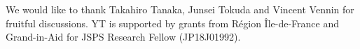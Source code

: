 \documentclass[a4paper,11pt]{article}
\begin{document}
\begin{comment}
Inspired by recent progress in the framework of curved-field-space inflation like 
\emph{geometrical destabilization}~\cite{Renaux-Petel:2015mga,Renaux-Petel:2017dia}, \emph{hyperinflation}~\cite{Brown:2017osf,Mizuno:2017idt},
and so on, we formulate the stochastic inflation in the curved field space case in this paper.
The fully covariant Langevin equations~(\ref{eq: covariant Langevin}) are derived in the effective Hamiltonian action approach, 
including metric perturbations.
While the metric perturbations only affect the equation of motion of the subhorizon mode functions,
the explicit appearance of the lapse function reveals that the Friedmann equation~(\ref{eq: Friedmann eq}) still holds in each Hubble patch 
without any noise.

As recently pointed out by Tokuda and Tanaka~\cite{Tokuda:2017fdh}, there is a fundamental problem in the time-depending decomposition
of the path integral measure and it is not completely understood but left as an important subject of future works.
Also we will study the behavior around or after the critical point in the geometrical destabilization framework with use of the obtained Langevin equations.
\end{comment}





\acknowledgments

We would like to thank Takahiro Tanaka, Junsei Tokuda and Vincent Vennin for fruitful discussions.
YT is supported by grants from R\'egion \^Ile-de-France and Grand-in-Aid for JSPS Research Fellow (JP18J01992).












\end{document}
